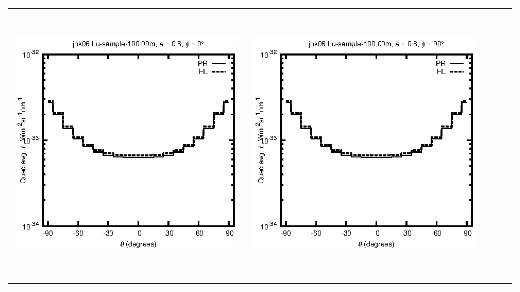 \documentclass[10pt,a4paper]{article}
\begin{document}
\begin{adjustwidth}{-1.2in}{-1.2in}
\begin{tabular}{c c c c}
\includegraphics[height=7cm]{../eps/jok06_Lu_sample_100.00m_fwd.eps} &
\includegraphics[height=7cm]{../eps/jok06_Lu_sample_100.00m_cross.eps} \\
\end{tabular}

\pagebreak


\end{adjustwidth}
\end{document}
